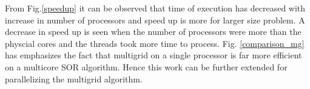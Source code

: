 From Fig.\ref{speedup} it can be observed that time of execution has decreased with increase in number of processors and speed up is more 
for larger size problem. A decrease in speed up is seen when the number of processors were more than the physcial cores and the threads took
more time to process. Fig. \ref{comparison_mg} has emphasizes the fact that multigrid on a single processor is far more efficient on a multicore
SOR algorithm. Hence this work can be further extended for parallelizing the multigrid algorithm.















